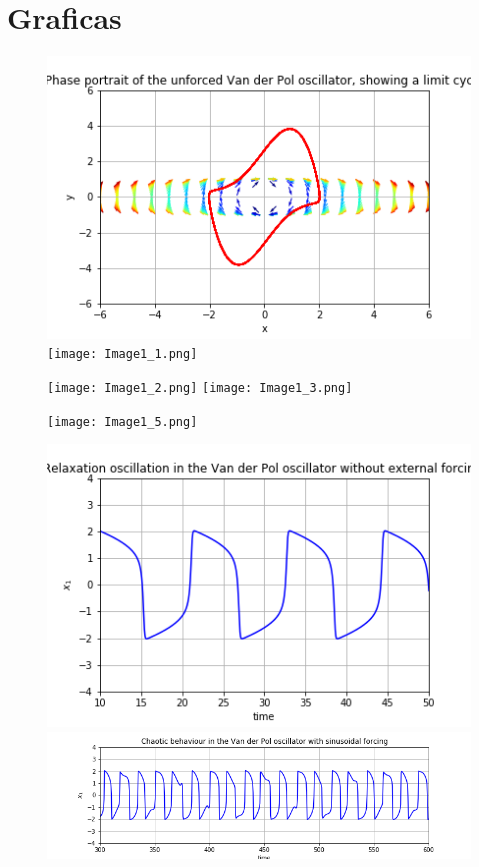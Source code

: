\documentclass{article}
\begin{document}
\section{Graficas}
\begin{figure}
\includegraphics[width=\linewidth]{Image1.png}
\texttt{[image: Image1\_1.png]}
\end{figure}
\begin{figure}
\texttt{[image: Image1\_2.png]}
\texttt{[image: Image1\_3.png]}
\end{figure}
\begin{figure}
\texttt{[image: Image1\_5.png]}
\end{figure}
\begin{figure}
\includegraphics[width=\linewidth]{Image3.png}
\includegraphics[width=\linewidth]{Image4.png}
\end{figure}
\end{document}
